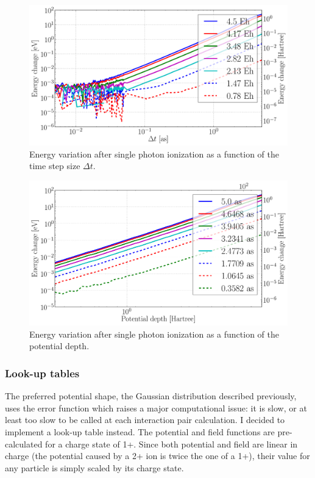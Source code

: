 \begin{figure}
 \centering
 \includegraphics[width=\figurewidth]{figures/numerical_heating_dt}
 \caption{\label{fig:potential:heating:dt}Energy variation after single photon
          ionization as a function of the time step size $\Delta t$.}
\end{figure}

\begin{figure}
 \centering
 \includegraphics[width=\figurewidth]{figures/numerical_heating_D}
 \caption{\label{fig:potential:heating:depth}Energy variation after single photon
          ionization as a function of the potential depth.}
\end{figure}


\subsubsection{Look-up tables}
\label{section:intro:md:potentials:lut}

The preferred potential shape, the Gaussian distribution described previously,
uses the error function which raises a major
computational issue: it is slow, or at least too slow to be called at each interaction pair
calculation. I decided to implement a look-up table instead.
The potential and field functions are pre-calculated for a charge state of 1+.
Since both potential and field are linear in charge (the potential caused by a 2+
ion is twice the one of a 1+), their value for any
particle is simply scaled by its charge state.

